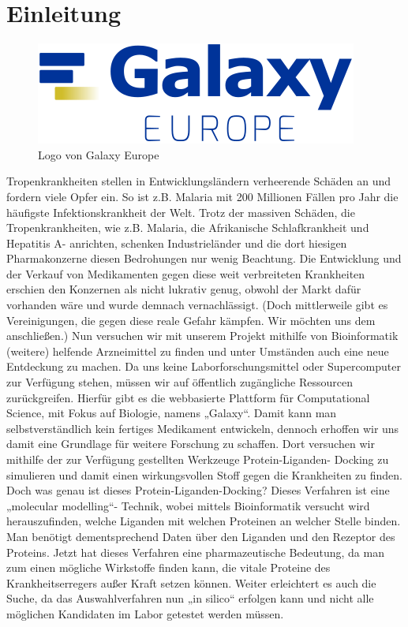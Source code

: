 \documentclass[11pt]{article}
\begin{document}
    \section{Einleitung}\label{sec:einleitung}


    \begin{figure}
        \includegraphics[width=\linewidth]{Galaxy-logo}
        \caption{Logo von Galaxy Europe}
    \end{figure}

    Tropenkrankheiten stellen in Entwicklungsländern verheerende Schäden an und fordern viele Opfer ein. So ist z.B. Malaria mit 200 Millionen Fällen pro Jahr die häufigste Infektionskrankheit der Welt. Trotz der massiven Schäden, die Tropenkrankheiten, wie z.B. Malaria, die Afrikanische Schlafkrankheit und Hepatitis A- anrichten, schenken Industrieländer und die dort hiesigen Pharmakonzerne diesen Bedrohungen nur wenig Beachtung. Die Entwicklung und der Verkauf von Medikamenten gegen diese weit verbreiteten Krankheiten erschien den Konzernen als nicht lukrativ genug, obwohl der Markt dafür vorhanden wäre und wurde demnach vernachlässigt. (Doch mittlerweile gibt es Vereinigungen, die gegen diese reale Gefahr kämpfen. Wir möchten uns dem anschließen.)  Nun versuchen wir mit unserem Projekt mithilfe von Bioinformatik (weitere) helfende Arzneimittel zu finden und unter Umständen auch eine neue Entdeckung zu machen. Da uns keine Laborforschungsmittel oder Supercomputer zur Verfügung stehen, müssen wir auf öffentlich zugängliche Ressourcen zurückgreifen. Hierfür gibt es die webbasierte Plattform für Computational Science, mit Fokus auf Biologie, namens „Galaxy“. Damit kann man selbstverständlich kein fertiges Medikament entwickeln, dennoch erhoffen wir uns damit eine Grundlage für weitere Forschung zu schaffen. Dort versuchen wir mithilfe der zur Verfügung gestellten Werkzeuge Protein-Liganden- Docking zu simulieren und damit einen wirkungsvollen Stoff gegen die Krankheiten zu finden. Doch was genau ist dieses Protein-Liganden-Docking? Dieses Verfahren ist eine „molecular modelling“- Technik, wobei mittels Bioinformatik versucht wird herauszufinden, welche Liganden mit welchen Proteinen an welcher Stelle binden. Man benötigt dementsprechend Daten über den Liganden und den Rezeptor des Proteins. Jetzt hat dieses Verfahren eine pharmazeutische Bedeutung, da man zum einen mögliche Wirkstoffe finden kann, die vitale Proteine des Krankheitserregers außer Kraft setzen können. Weiter erleichtert es auch die Suche, da das Auswahlverfahren nun „in silico“ erfolgen kann und nicht alle möglichen Kandidaten im Labor getestet werden müssen.
\end{document}
